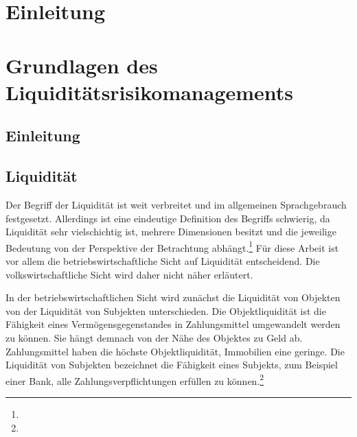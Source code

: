 \begin{onehalfspacing}

\chapter{Einleitung}

\loreIpsum

\loreIpsum

\loreIpsum

\loreIpsum

\chapter{Grundlagen des Liquiditätsrisikomanagements} 

\section{Einleitung}
\loreIpsum
\section{Liquidität}

Der Begriff der Liquidität ist weit verbreitet und im allgemeinen Sprachgebrauch festgesetzt. Allerdings ist eine eindeutige Definition des Begriffs schwierig, da Liquidität sehr vielschichtig ist, mehrere Dimensionen besitzt und die jeweilige Bedeutung von der Perspektive der Betrachtung abhängt.\footnote{ } Für diese Arbeit ist vor allem die betriebswirtschaftliche Sicht auf Liquidität entscheidend. Die volkswirtschaftliche Sicht wird daher nicht näher erläutert.

In der betriebswirtschaftlichen Sicht wird zunächst die Liquidität von Objekten von der Liquidität von Subjekten unterschieden. Die Objektliquidität ist die Fähigkeit eines Vermögensgegenstandes in Zahlungsmittel umgewandelt werden zu können. Sie hängt demnach von der Nähe des Objektes zu Geld ab. Zahlungsmittel haben die höchste Objektliquidität, Immobilien eine geringe. Die Liquidität von Subjekten bezeichnet die Fähigkeit eines Subjekts, zum Beispiel einer Bank, alle Zahlungsverpflichtungen erfüllen zu können.\footnote{ }


\end{onehalfspacing}
